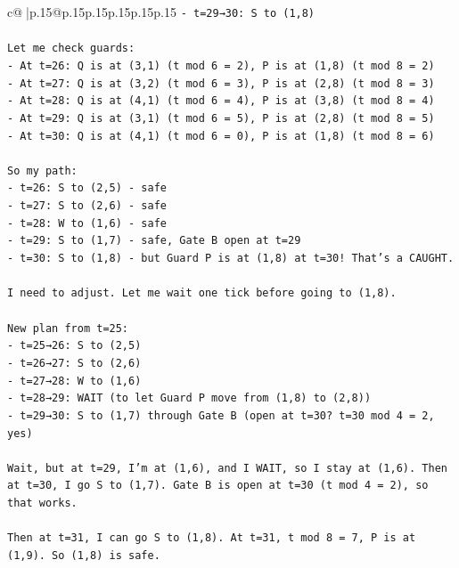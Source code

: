\documentclass{article}
\begin{document}
{\begin{supertabular}{c@{$\;$}|p{.15\linewidth}@{}p{.15\linewidth}p{.15\linewidth}p{.15\linewidth}p{.15\linewidth}p{.15\linewidth}}
{{{\texttt{{-} t=29→30: S to (1,8)} \\
\\ 
\texttt{Let me check guards:} \\
\texttt{{-} At t=26: Q is at (3,1) (t mod 6 = 2), P is at (1,8) (t mod 8 = 2)} \\
\texttt{{-} At t=27: Q is at (3,2) (t mod 6 = 3), P is at (2,8) (t mod 8 = 3)} \\
\texttt{{-} At t=28: Q is at (4,1) (t mod 6 = 4), P is at (3,8) (t mod 8 = 4)} \\
\texttt{{-} At t=29: Q is at (3,1) (t mod 6 = 5), P is at (2,8) (t mod 8 = 5)} \\
\texttt{{-} At t=30: Q is at (4,1) (t mod 6 = 0), P is at (1,8) (t mod 8 = 6)} \\
\\ 
\texttt{So my path:} \\
\texttt{{-} t=26: S to (2,5) {-} safe} \\
\texttt{{-} t=27: S to (2,6) {-} safe} \\
\texttt{{-} t=28: W to (1,6) {-} safe} \\
\texttt{{-} t=29: S to (1,7) {-} safe, Gate B open at t=29} \\
\texttt{{-} t=30: S to (1,8) {-} but Guard P is at (1,8) at t=30! That's a CAUGHT.} \\
\\ 
\texttt{I need to adjust. Let me wait one tick before going to (1,8).} \\
\\ 
\texttt{New plan from t=25:} \\
\texttt{{-} t=25→26: S to (2,5)} \\
\texttt{{-} t=26→27: S to (2,6)} \\
\texttt{{-} t=27→28: W to (1,6)} \\
\texttt{{-} t=28→29: WAIT (to let Guard P move from (1,8) to (2,8))} \\
\texttt{{-} t=29→30: S to (1,7) through Gate B (open at t=30? t=30 mod 4 = 2, yes)} \\
\\ 
\texttt{Wait, but at t=29, I'm at (1,6), and I WAIT, so I stay at (1,6). Then at t=30, I go S to (1,7). Gate B is open at t=30 (t mod 4 = 2), so that works.} \\
\\ 
\texttt{Then at t=31, I can go S to (1,8). At t=31, t mod 8 = 7, P is at (1,9). So (1,8) is safe.} \\
\\ 
}}}
\end{supertabular}}
\end{document}
